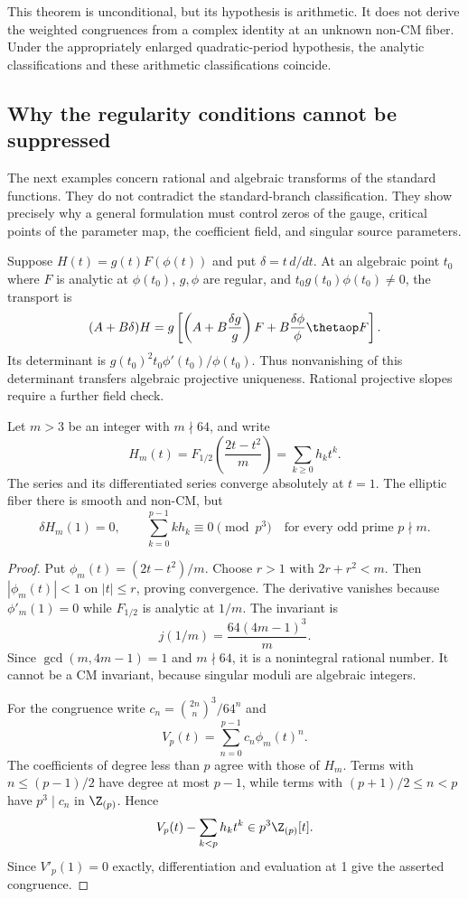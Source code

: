 This theorem is unconditional, but its hypothesis is arithmetic.
It does not derive the weighted congruences from a complex identity
at an unknown non-CM fiber.  Under the appropriately enlarged
quadratic-period hypothesis, the analytic classifications and these
arithmetic classifications coincide.


\subsection{Why the regularity conditions cannot be suppressed}
\label{sec:countermodel-guardrails}
The next examples concern rational and algebraic transforms of the
standard functions. They do not contradict the standard-branch
classification. They show precisely why a general formulation must
control zeros of the gauge, critical points of the parameter map, the
coefficient field, and singular source parameters.

Suppose $H(t)=g(t)F(\phi(t))$ and put $\delta=t\,d/dt$.
At an algebraic point $t_0$ where $F$ is analytic at $\phi(t_0)$,
$g,\phi$ are regular, and $t_0g(t_0)\phi(t_0)\ne0$, the transport is
\begin{equation}\label{eq:countermodel-transport}
 (A+B\delta)H=g\left[
 \left(A+B\frac{\delta g}{g}\right)F
 +B\frac{\delta\phi}{\phi}\thetaop F\right].
\end{equation}
Its determinant is $g(t_0)^2t_0\phi'(t_0)/\phi(t_0)$.
Thus nonvanishing of this determinant transfers algebraic projective
uniqueness. Rational projective slopes require a further field check.

\begin{proposition}
\label{prop:critical-countermodels}
Let $m>3$ be an integer with $m\nmid64$, and write
\[
 H_m(t)=F_{1/2}\!\left(\frac{2t-t^2}{m}\right)
       =\sum_{k\ge0}h_kt^k.
\]
The series and its differentiated series converge absolutely at
$t=1$. The elliptic fiber there is smooth and non-CM, but
\[
 \delta H_m(1)=0,\qquad
 \sum_{k=0}^{p-1}kh_k\equiv0\pmod{p^3}
 \quad\text{for every odd prime }p\nmid m.
\]
\end{proposition}
\begin{proof}
Put $\phi_m(t)=(2t-t^2)/m$. Choose $r>1$ with $2r+r^2<m$.
Then $|\phi_m(t)|<1$ on $|t|\le r$, proving convergence.
The derivative vanishes because $\phi'_m(1)=0$ while $F_{1/2}$ is
analytic at $1/m$. The invariant is
\[
 j(1/m)=\frac{64(4m-1)^3}{m}.
\]
Since $\gcd(m,4m-1)=1$ and $m\nmid64$, it is a nonintegral rational
number. It cannot be a CM invariant, because singular moduli are
algebraic integers.

For the congruence write
$c_n=\binom{2n}{n}^3/64^n$ and
\[
 V_p(t)=\sum_{n=0}^{p-1}c_n\phi_m(t)^n.
\]
The coefficients of degree less than $p$ agree with those of $H_m$.
Terms with $n\le(p-1)/2$ have degree at most $p-1$, while terms with
$(p+1)/2\le n<p$ have $p^3\mid c_n$ in $\Z_{(p)}$. Hence
\[
 V_p(t)-\sum_{k<p}h_kt^k\in p^3\Z_{(p)}[t].
\]
Since $V'_p(1)=0$ exactly, differentiation and evaluation at 1 give
the asserted congruence.
\end{proof}

